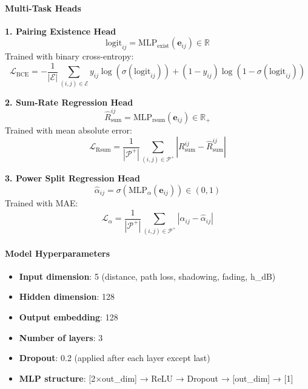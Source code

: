 \documentclass[12pt,a4paper]{article}
\begin{document}
\paragraph{Multi-Task Heads}

\textbf{1. Pairing Existence Head}
\begin{equation}
\text{logit}_{ij} = \text{MLP}_{\text{exist}}(\mathbf{e}_{ij}) \in \mathbb{R}
\end{equation}
Trained with binary cross-entropy:
\begin{equation}
\mathcal{L}_{\text{BCE}} = -\frac{1}{|\mathcal{E}|} \sum_{(i,j) \in \mathcal{E}} y_{ij} \log(\sigma(\text{logit}_{ij})) + (1-y_{ij})\log(1-\sigma(\text{logit}_{ij}))
\end{equation}

\textbf{2. Sum-Rate Regression Head}
\begin{equation}
\hat{R}_{\text{sum}}^{ij} = \text{MLP}_{\text{rsum}}(\mathbf{e}_{ij}) \in \mathbb{R}_+
\end{equation}
Trained with mean absolute error:
\begin{equation}
\mathcal{L}_{\text{Rsum}} = \frac{1}{|\mathcal{P}^+|} \sum_{(i,j) \in \mathcal{P}^+} |R_{\text{sum}}^{ij} - \hat{R}_{\text{sum}}^{ij}|
\end{equation}

\textbf{3. Power Split Regression Head}
\begin{equation}
\hat{\alpha}_{ij} = \sigma(\text{MLP}_{\alpha}(\mathbf{e}_{ij})) \in (0,1)
\end{equation}
Trained with MAE:
\begin{equation}
\mathcal{L}_{\alpha} = \frac{1}{|\mathcal{P}^+|} \sum_{(i,j) \in \mathcal{P}^+} |\alpha_{ij} - \hat{\alpha}_{ij}|
\end{equation}

\paragraph{Model Hyperparameters}
\begin{itemize}
    \item \textbf{Input dimension}: 5 (distance, path loss, shadowing, fading, h\_dB)
    \item \textbf{Hidden dimension}: 128
    \item \textbf{Output embedding}: 128
    \item \textbf{Number of layers}: 3
    \item \textbf{Dropout}: 0.2 (applied after each layer except last)
    \item \textbf{MLP structure}: [2×out\_dim] → ReLU → Dropout → [out\_dim] → [1]
\end{itemize}
\end{document}
